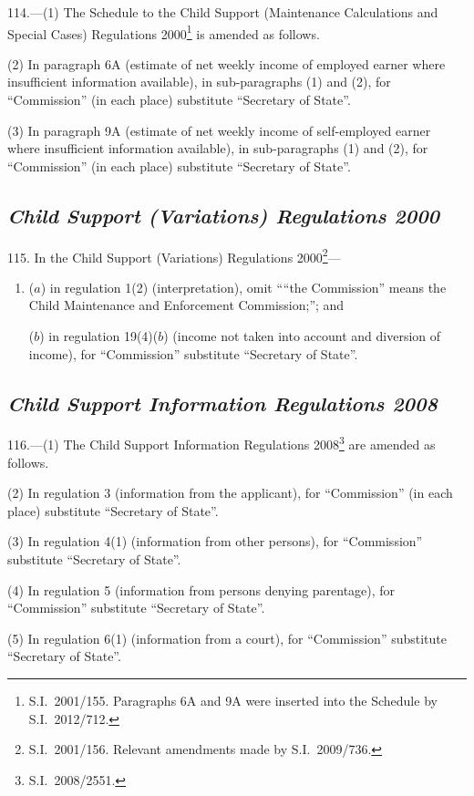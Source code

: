 \documentclass[12pt,a4paper]{article}
\begin{document}
114.---(1)  The Schedule to the Child Support (Maintenance Calculations and Special Cases) Regulations 2000\footnote{S.I.~2001/155. Paragraphs 6A and 9A were inserted into the Schedule by S.I.~2012/712.} is amended as follows.

(2) In paragraph 6A (estimate of net weekly income of employed earner where insufficient information available), in sub-paragraphs (1) and (2), for “Commission” (in each place) substitute “Secretary of State”.

(3) In paragraph 9A (estimate of net weekly income of self-employed earner where insufficient information available), in sub-paragraphs (1) and (2), for “Commission” (in each place) substitute “Secretary of State”.

\subsection*{\itshape Child Support (Variations) Regulations 2000}

115.  In the Child Support (Variations) Regulations 2000\footnote{S.I.~2001/156. Relevant amendments made by S.I.~2009/736.}—
\begin{enumerate}\item[]
($a$) in regulation 1(2) (interpretation), omit ““the Commission” means the Child Maintenance and Enforcement Commission;”; and

($b$) in regulation 19(4)($b$)  (income not taken into account and diversion of income), for “Commission” substitute “Secretary of State”.
\end{enumerate}

\subsection*{\itshape Child Support Information Regulations 2008}

116.---(1)  The Child Support Information Regulations 2008\footnote{S.I.~2008/2551.} are amended as follows.

(2) In regulation 3 (information from the applicant), for “Commission” (in each place) substitute “Secretary of State”.

(3) In regulation 4(1) (information from other persons), for “Commission” substitute “Secretary of State”.

(4) In regulation 5 (information from persons denying parentage), for “Commission” substitute “Secretary of State”.

(5) In regulation 6(1) (information from a court), for “Commission” substitute “Secretary of State”.
\end{document}
